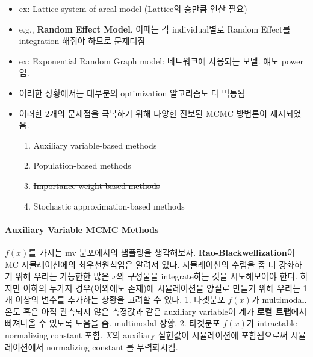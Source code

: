 \documentclass[
]{book}
\providecommand{\tightlist}{%
  \setlength{\itemsep}{0pt}\setlength{\parskip}{0pt}}
\begin{document}
\begin{itemize}
\begin{enumerate}
\begin{itemize}
      \begin{itemize}
      \tightlist
      \item
        ex: Lattice system of areal model (Lattice의 승만큼 연산 필요)
      \item
        e.g., \textbf{Random Effect Model}. 이때는 각 individual별로 Random Effect를 integration 해줘야 하므로 문제터짐
      \item
        ex: Exponential Random Graph model: 네트워크에 사용되는 모델. 얘도 power임.
      \item
        이러한 상황에서는 대부분의 optimization 알고리즘도 다 먹통됨
      \end{itemize}
    \end{itemize}
  \end{enumerate}
\end{itemize}

\begin{itemize}
\tightlist
\item
  이러한 2개의 문제점을 극복하기 위해 다양한 진보된 MCMC 방법론이 제시되었음.

  \begin{enumerate}
  \def\labelenumi{\arabic{enumi}.}
  \tightlist
  \item
    Auxiliary variable-based methods
  \item
    Population-based methods
  \item
    \sout{Importance weight-based methods}
  \item
    Stochastic approximation-based methods
  \end{enumerate}
\end{itemize}

\hypertarget{auxiliary-variable-mcmc-methods}{%
\paragraph{Auxiliary Variable MCMC Methods}\label{auxiliary-variable-mcmc-methods}}

\(f(x)\)를 가지는 mv 분포에서의 샘플링을 생각해보자. \textbf{Rao-Blackwellization}이 MC 시뮬레이션에의 최우선원칙임은 알려져 있다. 시뮬레이션의 수렴을 좀 더 강화하기 위해 우리는 가능한한 많은 \(x\)의 구성물을 integrate하는 것을 시도해보아야 한다. 하지만 이하의 두가지 경우(이외에도 존재)에 시뮬레이션을 양질로 만들기 위해 우리는 1개 이상의 변수를 추가하는 상황을 고려할 수 있다.
1. 타겟분포 \(f(x)\)가 multimodal. 온도 혹은 아직 관측되지 않은 측정값과 같은 auxiliary variable이 계가 \textbf{로컬 트랩}에서 빠져나올 수 있도록 도움을 줌. multimodal 상황.
2. 타겟분포 \(f(x)\)가 intractable normalizing constant 포함. \(X\)의 auxiliary 실현값이 시뮬레이션에 포함됨으로써 시뮬레이션에서 normalizing constant 를 무력화시킴.
\end{document}
